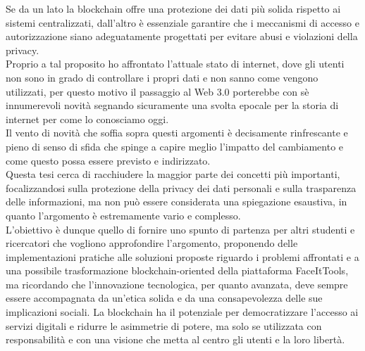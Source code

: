 Se da un lato la blockchain offre una protezione dei dati più solida rispetto ai sistemi centralizzati, dall’altro è essenziale garantire che i meccanismi di accesso e autorizzazione siano adeguatamente progettati per evitare abusi e violazioni della privacy.
\\Proprio a tal proposito ho affrontato l'attuale stato di internet, dove gli utenti non sono in grado di controllare i propri dati e non sanno come vengono utilizzati, per questo motivo il passaggio al Web 3.0 porterebbe con sè innumerevoli novità segnando sicuramente una svolta epocale per la storia di internet per come lo conosciamo oggi.
\\Il vento di novità che soffia sopra questi argomenti è decisamente rinfrescante e pieno di senso di sfida che spinge a capire meglio l'impatto del cambiamento e come questo possa essere previsto e indirizzato.
\\Questa tesi cerca di racchiudere la maggior parte dei concetti più importanti, focalizzandosi sulla protezione della privacy dei dati personali e sulla trasparenza delle informazioni,
ma non può essere considerata una spiegazione esaustiva, in quanto l'argomento è estremamente vario e complesso. 
\\L'obiettivo è dunque quello di fornire uno spunto di partenza per altri studenti e ricercatori che vogliono approfondire l'argomento, proponendo delle implementazioni pratiche alle soluzioni proposte riguardo i problemi affrontati e a una possibile trasformazione blockchain-oriented della piattaforma FaceItTools, ma ricordando che l’innovazione tecnologica, per quanto avanzata, deve sempre essere accompagnata da un’etica solida e da una consapevolezza delle sue implicazioni sociali. 
La blockchain ha il potenziale per democratizzare l’accesso ai servizi digitali e ridurre le asimmetrie di potere, ma solo se utilizzata con responsabilità e con una visione che metta al centro gli utenti e la loro libertà.